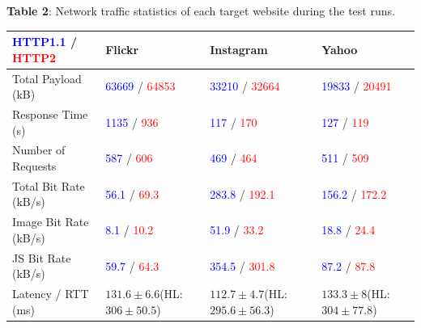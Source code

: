 \documentclass[noback]{cuposter}
\begin{document}
\begin{center}

\textbf{Table 2}: Network traffic statistics of each target website during the test runs.

\begin{tabular}{|l|K{7.2cm}|K{8cm}|K{7.5cm}|}
    \hline
    \textcolor{blue}{HTTP1.1} / \textcolor{red}{HTTP2} & Flickr & Instagram & Yahoo \\ \hline \hline
    Total Payload (kB) & \textcolor{blue}{63669} / \textcolor{red}{64853}  & \textcolor{blue}{33210} / \textcolor{red}{32664}  & 
    \textcolor{blue}{19833} / \textcolor{red}{20491}  \\ \hline
    Response Time (s) & \textcolor{blue}{1135} / \textcolor{red}{936}  &\textcolor{blue}{117} / \textcolor{red}{170}  & 
    \textcolor{blue}{127} / \textcolor{red}{119}  \\ \hline
    
    Number of Requests & \textcolor{blue}{587} / \textcolor{red}{606} & \textcolor{blue}{469} / \textcolor{red}{464} & \textcolor{blue}{511} / \textcolor{red}{509} \\ \hline \hline
    
    Total Bit Rate (kB/s) & \textcolor{blue}{56.1} / \textcolor{red}{69.3} & \textcolor{blue}{283.8} / \textcolor{red}{192.1} & \textcolor{blue}{156.2} / \textcolor{red}{172.2} \\  \hline
    
    Image Bit Rate (kB/s) & \textcolor{blue}{8.1} / \textcolor{red}{10.2} &\textcolor{blue}{51.9} / \textcolor{red}{33.2}  & \textcolor{blue}{18.8} / \textcolor{red}{24.4}  \\ \hline 
    
    JS Bit Rate (kB/s) & \textcolor{blue}{59.7} / \textcolor{red}{64.3} &\textcolor{blue}{354.5} / \textcolor{red}{301.8}  & \textcolor{blue}{87.2} / \textcolor{red}{87.8}  \\ \hline \hline
    
    Latency / RTT (ms) & $131.6\pm6.6$\newline(HL: $306\pm50.5$)	& $112.7\pm4.7$\newline(HL: $295.6\pm56.3$) & $133.3\pm8$\newline(HL: $304\pm77.8$)	\\ \hline
\end{tabular}
\end{center}
\vspace{8mm}
\end{document}
